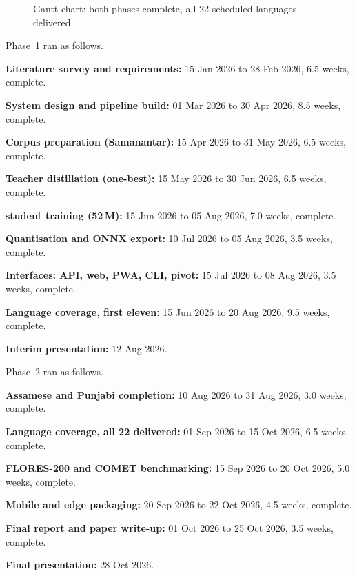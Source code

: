 \begin{landscape}
\begin{figure}[H]
\caption{Gantt chart: both phases complete, all 22 scheduled languages delivered}
\label{fig:gantt}
\end{figure}
\vspace*{\fill}
\end{landscape}

Phase~1 ran as follows.

\begin{bullets}
\item \textbf{Literature survey and requirements:} 15 Jan 2026 to 28 Feb 2026, 6.5 weeks, complete.
\item \textbf{System design and pipeline build:} 01 Mar 2026 to 30 Apr 2026, 8.5 weeks, complete.
\item \textbf{Corpus preparation (Samanantar):} 15 Apr 2026 to 31 May 2026, 6.5 weeks, complete.
\item \textbf{Teacher distillation (one-best):} 15 May 2026 to 30 Jun 2026, 6.5 weeks, complete.
\item \textbf{\seqkd{} student training (52\,M):} 15 Jun 2026 to 05 Aug 2026, 7.0 weeks, complete.
\item \textbf{Quantisation and ONNX export:} 10 Jul 2026 to 05 Aug 2026, 3.5 weeks, complete.
\item \textbf{Interfaces: API, web, PWA, CLI, pivot:} 15 Jul 2026 to 08 Aug 2026, 3.5 weeks, complete.
\item \textbf{Language coverage, first eleven:} 15 Jun 2026 to 20 Aug 2026, 9.5 weeks, complete.
\item \textbf{Interim presentation:} 12 Aug 2026.
\end{bullets}

Phase~2 ran as follows.

\begin{bullets}
\item \textbf{Assamese and Punjabi completion:} 10 Aug 2026 to 31 Aug 2026, 3.0 weeks, complete.
\item \textbf{Language coverage, all 22 delivered:} 01 Sep 2026 to 15 Oct 2026, 6.5 weeks, complete.
\item \textbf{FLORES-200 and COMET benchmarking:} 15 Sep 2026 to 20 Oct 2026, 5.0 weeks, complete.
\item \textbf{Mobile and edge packaging:} 20 Sep 2026 to 22 Oct 2026, 4.5 weeks, complete.
\item \textbf{Final report and paper write-up:} 01 Oct 2026 to 25 Oct 2026, 3.5 weeks, complete.
\item \textbf{Final presentation:} 28 Oct 2026.
\end{bullets}

